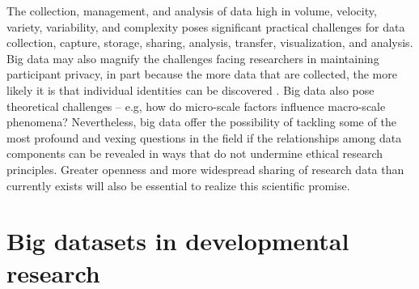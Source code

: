 \documentclass[letterpaper,man,apacite]{apa6}
\begin{document}
The collection, management, and analysis of data high in volume, velocity, variety, variability, and complexity poses significant practical challenges for data collection, capture, storage, sharing, analysis, transfer, visualization, and analysis.
Big data may also magnify the challenges facing researchers in maintaining participant privacy, in part because the more data that are collected, the more likely it is that individual identities can be discovered \cite{sweeney_identifiability}.
Big data also pose theoretical challenges -- e.g, how do micro-scale factors influence macro-scale phenomena?
Nevertheless, big data offer the possibility of tackling some of the most profound and vexing questions in the field if the relationships among data components can be revealed in ways that do not undermine ethical research principles.
Greater openness and more widespread sharing of research data than currently exists will also be essential to realize this scientific promise.

\section{Big datasets in developmental research}
\end{document}
